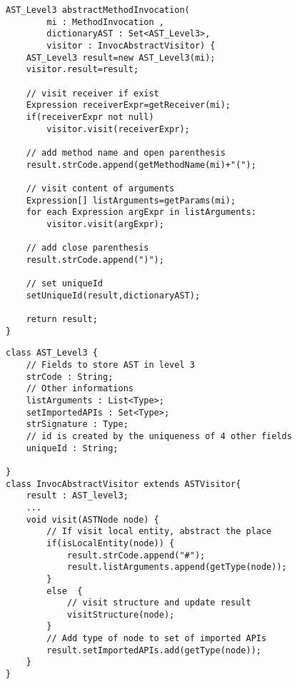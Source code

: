 \begin{minipage}[c]{0.45\textwidth}
\begin{lstlisting}[basicstyle=\tiny,caption={Algorithm for Method Invocation Abstraction},label={lt:AlgorithmMethodAbstractor}]
AST_Level3 abstractMethodInvocation(
		mi : MethodInvocation ,
		dictionaryAST : Set<AST_Level3>,
		visitor : InvocAbstractVisitor) {
	AST_Level3 result=new AST_Level3(mi);		
	visitor.result=result;
	
    // visit receiver if exist 
	Expression receiverExpr=getReceiver(mi);		
	if(receiverExpr not null)
		visitor.visit(receiverExpr);
	
	// add method name and open parenthesis
	result.strCode.append(getMethodName(mi)+"(");
	
	// visit content of arguments
	Expression[] listArguments=getParams(mi);		
	for each Expression argExpr in listArguments:
		visitor.visit(argExpr);
	
	// add close parenthesis
	result.strCode.append(")");

	// set uniqueId
	setUniqueId(result,dictionaryAST);
	
	return result;		
}

\end{lstlisting}
\end{minipage}\hfill
\begin{minipage}[c]{0.45\textwidth}
\begin{lstlisting}[basicstyle=\tiny,caption={Definition of AST\_Level3 and InvocAbstractVisitor},label={lt:AlgorithmMethodAbstractorPartB}]
class AST_Level3 {
	// Fields to store AST in level 3
	strCode : String;
	// Other informations
	listArguments : List<Type>;
	setImportedAPIs : Set<Type>;	
	strSignature : Type;
	// id is created by the uniqueness of 4 other fields 
	uniqueId : String;
	
}
class InvocAbstractVisitor extends ASTVisitor{
	result : AST_level3;
	...		
	void visit(ASTNode node) {
		// If visit local entity, abstract the place
		if(isLocalEntity(node)) {
			result.strCode.append("#");
			result.listArguments.append(getType(node));				
		} 
		else  {	
			// visit structure and update result
			visitStructure(node);
		} 			
		// Add type of node to set of imported APIs
		result.setImportedAPIs.add(getType(node));		
	}	
}
\end{lstlisting}

\end{minipage}\hfill


